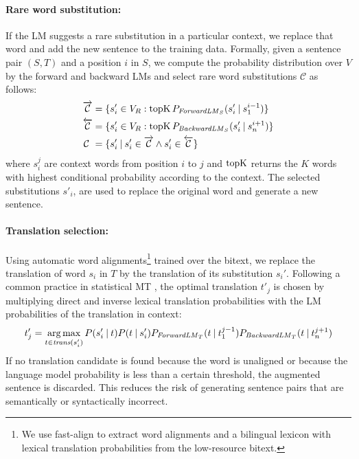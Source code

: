 \paragraph{Rare word substitution:}
If the LM suggests a rare substitution in a particular context, we replace that word and add the new sentence to the training data.
Formally, given a sentence pair $(S,T)$ and a position $i$ in $S$, we compute the probability distribution over $V$ by the forward and backward LMs and select rare word substitutions $\mathcal{C}$ as follows:
\begin{align}
\overrightarrow{\mathcal{C}} & = \{ s'_i \in V_{R} : \operatorname*{topK}  P_{\textrm{\textit{ForwardLM}}_S}(s'_i \:\vert\: s_{1}^{i-1}) \} \\
\overleftarrow{\mathcal{C}} & = \{ s'_i \in V_{R} : \operatorname*{topK} P_{\textrm{\textit{BackwardLM}}_S}(s'_i \:\vert\: s_{n}^{i+1}) \} \\
\mathcal{C} \ & = \{s'_i \:\vert\: s'_i \in \overrightarrow{\mathcal{C}} \land s'_i \in \overleftarrow{\mathcal{C}} \} 
\end{align}
where $s_{i}^{j}$ are context words from position $i$ to $j$ and $\operatorname*{topK}$ returns the $K$ words with highest conditional probability according to the context. 
The selected substitutions $s'_i$, are used to replace the original word and generate a new sentence.
%

\paragraph{Translation selection:}
Using automatic word alignments\footnote{We use fast-align \citep{dyer-chahuneau-smith:2013:NAACL-HLT} to extract word alignments and a bilingual lexicon with lexical translation probabilities from the low-resource bitext.} trained over the bitext, we replace the translation of word $s_i$ in $T$ by the translation of its substitution $s_i'$. 
Following a common practice in statistical MT \citep{koehn-etal-2007-moses}, the optimal translation $t'_j$ is chosen by multiplying direct and inverse lexical translation probabilities with the LM probabilities of the translation in context: %
\begin{equation}
t'_j =  \mathop{\operatorname*{arg\,max}}_{t \in \textit{trans}(s_i')} P(s'_i \:\vert\: t) P(t \:\vert\: s'_i) P_{\textrm{\textit{ForwardLM}}_T}(t \:\vert\: t_{1}^{j-1}) P_{\textrm{\textit{BackwardLM}}_T}(t \:\vert\: t_{n}^{j+1})
\end{equation}
%
If no translation candidate is found because the word is unaligned or because
the language model probability is less than a certain threshold, the augmented sentence is discarded.
This reduces the risk of generating sentence pairs that are semantically or syntactically incorrect.

